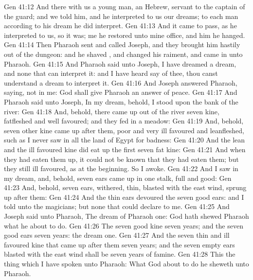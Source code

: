 \vs Gen 41:12 And  there with us a young man, an Hebrew, servant to the captain of the guard; and we told him, and he interpreted to us our dreams; to each man according to his dream he did interpret.
\vs Gen 41:13 And it came to pass, as he interpreted to us, so it was; me he restored unto mine office, and him he hanged.
\vs Gen 41:14 Then Pharaoh sent and called Joseph, and they brought him hastily out of the dungeon: and he shaved , and changed his raiment, and came in unto Pharaoh.
\vs Gen 41:15 And Pharaoh said unto Joseph, I have dreamed a dream, and  none that can interpret it: and I have heard say of thee,  thou canst understand a dream to interpret it.
\vs Gen 41:16 And Joseph answered Pharaoh, saying,  not in me: God shall give Pharaoh an answer of peace.
\vs Gen 41:17 And Pharaoh said unto Joseph, In my dream, behold, I stood upon the bank of the river:
\vs Gen 41:18 And, behold, there came up out of the river seven kine, fatfleshed and well favoured; and they fed in a meadow:
\vs Gen 41:19 And, behold, seven other kine came up after them, poor and very ill favoured and leanfleshed, such as I never saw in all the land of Egypt for badness:
\vs Gen 41:20 And the lean and the ill favoured kine did eat up the first seven fat kine:
\vs Gen 41:21 And when they had eaten them up, it could not be known that they had eaten them; but they  still ill favoured, as at the beginning. So I awoke.
\vs Gen 41:22 And I saw in my dream, and, behold, seven ears came up in one stalk, full and good:
\vs Gen 41:23 And, behold, seven ears, withered, thin,  blasted with the east wind, sprung up after them:
\vs Gen 41:24 And the thin ears devoured the seven good ears: and I told  unto the magicians; but  none that could declare  to me.
\vs Gen 41:25 And Joseph said unto Pharaoh, The dream of Pharaoh  one: God hath shewed Pharaoh what he  about to do.
\vs Gen 41:26 The seven good kine  seven years; and the seven good ears  seven years: the dream  one.
\vs Gen 41:27 And the seven thin and ill favoured kine that came up after them  seven years; and the seven empty ears blasted with the east wind shall be seven years of famine.
\vs Gen 41:28 This  the thing which I have spoken unto Pharaoh: What God  about to do he sheweth unto Pharaoh.
